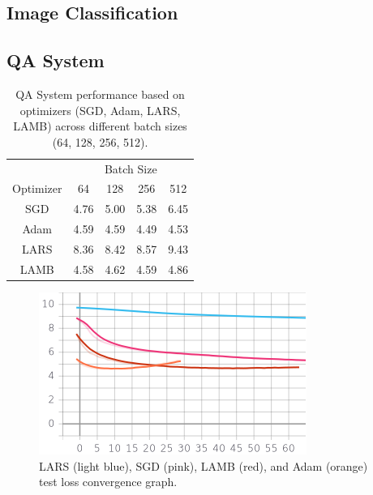 \subsection{Image Classification}


\subsection{QA System}

\begin{table}[!t]
\vspace{-5pt}
\small
\vspace{7pt}
\caption{QA System performance based on optimizers (SGD, Adam, LARS, LAMB) across different batch sizes (64, 128, 256, 512).}\label{tbl:results}
\vspace{-10pt}
\begin{center}
\begin{tabular}{ c|c|c|c|c}
\multicolumn{1}{c|}{} &  \multicolumn{4}{c}{Batch Size}\\ \cline{2-5}
\multicolumn{1}{c|}{Optimizer} &
 \multicolumn{1}{c|}{64} &
 \multicolumn{1}{c|}{128} &
 \multicolumn{1}{c|}{256} &
 \multicolumn{1}{c}{512} \\
\hline
SGD & 4.76 & 5.00 & 5.38 & 6.45\\
Adam &  4.59 & \cellcolor{gray!30} 4.59 &  \cellcolor{gray!30} 4.49 & \cellcolor{gray!30} 4.53\\
LARS & 8.36 & 8.42 & 8.57 & 9.43\\
LAMB & \cellcolor{gray!30} 4.58 & 4.62 & 4.59 & 4.86\\
\end{tabular}
\end{center}
\vspace{-15pt}
\end{table}



\begin{figure}[!t]
    \centering
    \includegraphics[width=0.7\linewidth]{img/drqa_128_blars_oadam_psgd_rlamb.png}
    \caption{LARS (light blue), SGD (pink), LAMB (red), and Adam (orange) test loss convergence graph.}
    \label{fig:128}
\end{figure}

